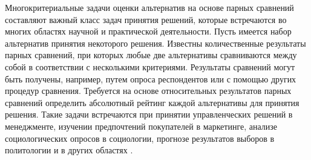 \documentclass[specialist, substylefile = spbureport.rtx,
               subf,href,colorlinks=true, 12pt]{disser}
\begin{document}








    \pagebreak
    \tableofcontents
    \pagebreak

    \intro

    Многокритериальные задачи оценки альтернатив на основе парных сравнений составляют важный класс задач принятия решений, которые встречаются во многих областях научной и практической деятельности. Пусть имеется набор альтернатив принятия некоторого решения. Известны количественные результаты парных сравнений, при которых любые две альтернативы сравниваются между собой в соответствии с несколькими критериями. Результаты сравнений могут быть получены, например, путем опроса респондентов или с помощью других процедур сравнения. Требуется на основе относительных результатов парных сравнений определить абсолютный рейтинг каждой альтернативы для принятия решения. Такие задачи встречаются при принятии управленческих решений в менеджменте, изучении предпочтений покупателей в маркетинге, анализе социологических опросов в социологии, прогнозе результатов выборов в политологии и в других областях \cite{Saaty1993Prinyatie}. 
\end{document}
